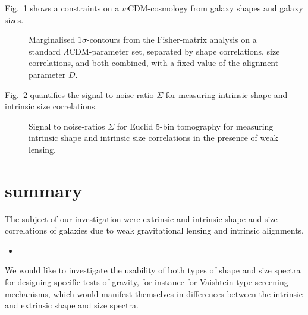 \documentclass[a4paper,fleqn,usenatbib]{mnras}
\begin{document}
Fig.~\ref{fig:fisher} shows a constraints on a $w$CDM-cosmology from galaxy shapes and galaxy sizes.

\begin{figure}
\centering
\caption{Marginalised $1\sigma$-contours from the Fisher-matrix analysis on a standard $\Lambda$CDM-parameter set, separated by shape correlations, size correlations, and both combined, with a fixed value of the alignment parameter $D$.}
\label{fig:fisher}
\end{figure}

Fig.~\ref{fig:s2n} quantifies the signal to noise-ratio $\Sigma$ for measuring intrinsic shape and intrinsic size correlations.

\begin{figure}
\centering
\caption{Signal to noise-ratios $\Sigma$ for Euclid 5-bin tomography for measuring intrinsic shape and intrinsic size correlations in the presence of weak lensing.}
\label{fig:s2n}
\end{figure}


\section{summary}\label{sect_summary}
The subject of our investigation were extrinsic and intrinsic shape and size correlations of galaxies due to weak gravitational lensing and intrinsic alignments. 
\begin{itemize}
\item{}
\end{itemize}
We would like to investigate the usability of both types of shape and size spectra for designing specific tests of gravity, for instance for Vaishtein-type screening mechanisms, which would manifest themselves in differences between the intrinsic and extrinsic shape and size spectra.
\end{document}

